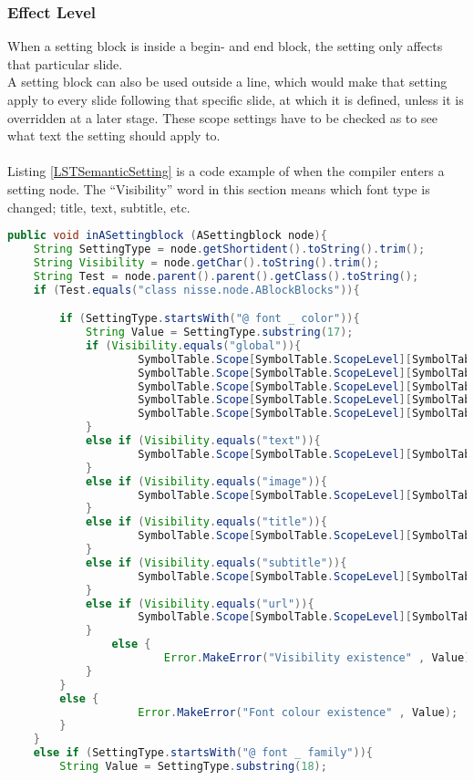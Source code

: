 \subsubsection*{Effect Level}
When a setting block is inside a begin- and end block, the setting only affects that particular slide.\\
A setting block can also be used outside a line, which would make that setting apply to every slide following that specific slide, at which it is defined, unless it is overridden at a later stage. These scope settings have to be checked as to see what text the setting should apply to.
\\ \\
Listing \ref{LSTSemanticSetting} is a code example of when the compiler enters a setting node. The ``Visibility'' word in this section means which font type is changed; title, text, subtitle, etc.

\begin{lstlisting}[frame=single,caption=SettingBlock, label=LSTSemanticSetting, language=java]
public void inASettingblock (ASettingblock node){
	String SettingType = node.getShortident().toString().trim();
	String Visibility = node.getChar().toString().trim();
	String Test = node.parent().parent().getClass().toString();
	if (Test.equals("class nisse.node.ABlockBlocks")){

		if (SettingType.startsWith("@ font _ color")){
			String Value = SettingType.substring(17);
			if (Visibility.equals("global")){
					SymbolTable.Scope[SymbolTable.ScopeLevel][SymbolTable.NewTextFontColor] = Value;
					SymbolTable.Scope[SymbolTable.ScopeLevel][SymbolTable.NewTitleFontColor] = Value;					
					SymbolTable.Scope[SymbolTable.ScopeLevel][SymbolTable.NewSubtitleFontColor] = Value;
					SymbolTable.Scope[SymbolTable.ScopeLevel][SymbolTable.NewImageFontColor] = Value;
					SymbolTable.Scope[SymbolTable.ScopeLevel][SymbolTable.NewUrlFontColor] = Value;
			}
			else if (Visibility.equals("text")){
					SymbolTable.Scope[SymbolTable.ScopeLevel][SymbolTable.NewTextFontColor] = Value;
			}
			else if (Visibility.equals("image")){
					SymbolTable.Scope[SymbolTable.ScopeLevel][SymbolTable.NewImageFontColor] = Value;
			}
			else if (Visibility.equals("title")){
					SymbolTable.Scope[SymbolTable.ScopeLevel][SymbolTable.NewTitleFontColor] = Value;
			}
			else if (Visibility.equals("subtitle")){
					SymbolTable.Scope[SymbolTable.ScopeLevel][SymbolTable.NewSubtitleFontColor] = Value;
			}
			else if (Visibility.equals("url")){
					SymbolTable.Scope[SymbolTable.ScopeLevel][SymbolTable.NewUrlFontColor] = Value;
			}
    	  		else {
						Error.MakeError("Visibility existence" , Value);
			}
		}
		else {
					Error.MakeError("Font colour existence" , Value);
		}
	}
	else if (SettingType.startsWith("@ font _ family")){	
		String Value = SettingType.substring(18);

\end{lstlisting}


